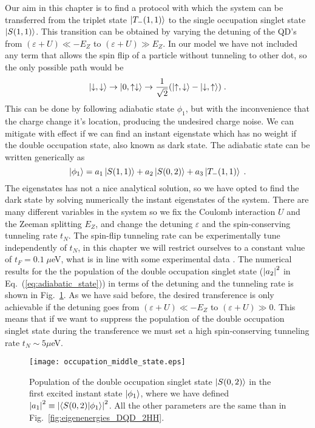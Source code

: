 Our aim in this chapter is to find a protocol with which the system can be transferred from the triplet state $\ket{T_-(1,1)}$ to the single occupation singlet state $\ket{S(1,1)}$. This transition can be obtained by varying the detuning of the QD's from $(\varepsilon+U)\ll-E_Z$ to $(\varepsilon+U)\gg E_Z$. In our model we have not included any term that allows the spin flip of a particle without tunneling to other dot, so the only possible path would be
\begin{equation}
	\ket{\downarrow,\downarrow}\rightarrow\ket{0,\uparrow\downarrow}\rightarrow\frac{1}{\sqrt{2}}(\ket{\uparrow,\downarrow}-\ket{\downarrow,\uparrow})\; .
\end{equation}
This can be done by following adiabatic state $\phi_1$, but with the inconvenience that the charge change it's location, producing the undesired charge noise. We can mitigate with effect if we can find an instant eigenstate which has no weight if the double occupation state, also known as dark state. The adiabatic state can be written generically as
\begin{equation}
	\ket{\phi_1}=a_1\ket{S(1,1)}+a_2\ket{S(0,2)}+a_3\ket{T_-(1,1)}\; .
	\label{eq:adiabatic_state}
\end{equation}
The eigenstates has not a nice analytical solution, so we have opted to find the dark state by solving numerically the instant eigenstates of the system. There are many different variables in the system so we fix the Coulomb interaction $U$ and the Zeeman splitting $E_Z$, and change the detuning $\varepsilon$ and the spin-conserving tunneling rate $t_N$. The spin-flip tunneling rate can be experimentally tune independently of $t_N$, in this chapter we will restrict ourselves to a constant value of $t_F=0.1\; \mu$eV, what is in line with some experimental data \cite{Bogan2018}. The numerical results for the the population of the double occupation singlet state ($\abs{a_2}^2$ in Eq.~(\ref{eq:adiabatic_state})) in terms of the detuning and the tunneling rate is shown in Fig.~\ref{fig:occupation_middle_state}. As we have said before, the desired transference is only achievable if the detuning goes from $(\varepsilon+U)\ll -E_Z$ to $(\varepsilon+U)\gg 0$. This means that if we want to suppress the population of the double occupation singlet state during the transference we must set a high spin-conserving tunneling rate $t_N\sim 5\mu$eV.
\begin{figure}[!htb]
	\centering
	\texttt{[image: occupation\_middle\_state.eps]}
	\caption{Population of the double occupation singlet state $\ket{S(0,2)}$ in the first excited instant state $\ket{\phi_1}$, where we have defined $\abs{a_1}^2\equiv \abs{\braket{S(0,2)}{\phi_1}}^2$. All the other parameters are the same than in Fig.~\ref{fig:eigenenergies_DQD_2HH}.}
	\label{fig:occupation_middle_state}
\end{figure}


